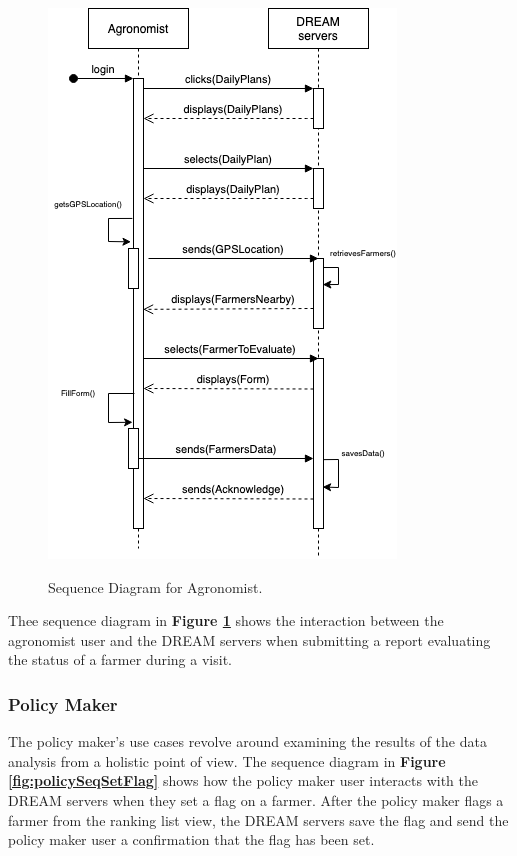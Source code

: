 \begin{figure}[hpt!]
\centering
\includegraphics[scale=0.45]{Files/sequence_disgrams/thePNGs/agronomist_sendReport.png}\\
\caption{\label{fig:agrSeqSendReport}Sequence Diagram for Agronomist.}
\end{figure}

\begin{flushleft}
Thee sequence diagram in \textbf{Figure \ref{fig:agrSeqSendReport}} shows the interaction between the agronomist user and the DREAM servers when submitting a report evaluating the status of a farmer during a visit.
\end{flushleft}


\newpage
\subsubsection{Policy Maker}


\begin{flushleft}
The policy maker's use cases revolve around examining the results of the data analysis from a holistic point of view. The sequence diagram in \textbf{Figure \ref{fig:policySeqSetFlag}} shows how the policy maker user interacts with the DREAM servers when they set a flag on a farmer. After the policy maker flags a farmer from the ranking list view, the DREAM servers save the flag and send the policy maker user a confirmation that the flag has been set.
\end{flushleft}

